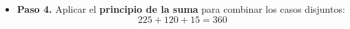 \documentclass[a4paper,12pt]{article}
\begin{document}
 \begin{ejercicio}[title=Ejercicio 30]
 \begin{itemize}
 \begin{itemize}
 \item 5 mujeres de 6 y 3 hombres de 6:
 \[
 \binom{6}{5}\binom{6}{3} = 6 \cdot 20 = 120
 \]
 \item 6 mujeres de 6 y 2 hombres de 6:
 \[
 \binom{6}{6}\binom{6}{2} = 1 \cdot 15 = 15
 \]
\end{itemize}

\item[] \textbf{Paso 4.} Aplicar el \textbf{principio de la suma} para combinar los casos disjuntos:
\[
225 + 120 + 15 = \boxed{360}
\]

\end{itemize}

\end{ejercicio}
\end{document}

